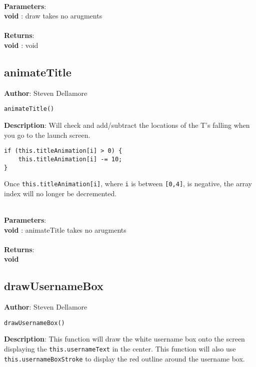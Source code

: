 \documentclass[12pt]{article}
\begin{document}
\textbf{\large{\\Parameters}}:\\
\textbf{void }: draw takes no arugments\\\textbf{\large{\\Returns}}:\\\textbf{void }: void

\subsection{animateTitle}
\textbf{Author}: Steven Dellamore 
\vspace*{1\baselineskip}
\begin{lstlisting}
animateTitle()
\end{lstlisting} 
\vspace*{1\baselineskip}
\textbf{Description}: Will check and add/subtract the locations of the T's falling when you go to the launch screen. 
\begin{verbatim}
if (this.titleAnimation[i] > 0) {
	this.titleAnimation[i] -= 10;
}
\end{verbatim}
 Once \texttt{this.titleAnimation[i]}, where \texttt{i} is between \texttt{[0,4]}, is negative, the array index will no longer be decremented. 


\textbf{\large{\\Parameters}}:\\
\textbf{void }: animateTitle takes no arugments\\\textbf{\large{\\Returns}}:\\\textbf{void}

\subsection{drawUsernameBox}
\textbf{Author}: Steven Dellamore 
\vspace*{1\baselineskip}
\begin{lstlisting}
drawUsernameBox()
\end{lstlisting} 
\vspace*{1\baselineskip}
\textbf{Description}: This function will draw the white username box onto the screen displaying the \texttt{this.usernameText} in the center. This function will also use \texttt{this.usernameBoxStroke} to display the red outline around the username box. 
\end{document}
